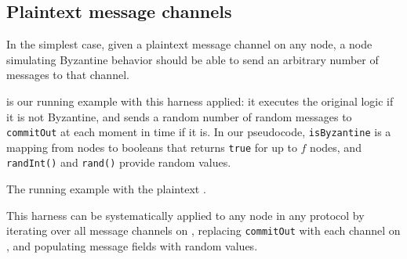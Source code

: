 
\subsection{Plaintext message channels}
\label{sec:plaintext-channels-formalism}
In the simplest case, given a plaintext message channel on any node, a node simulating Byzantine behavior should be able
to send an arbitrary number of messages to that channel.

 is our running example with this harness applied: it executes the original logic if it is not Byzantine, and sends a random number of random messages to \texttt{commitOut} at each moment in time if it is.
In our pseudocode, \texttt{isByzantine} is a mapping from nodes to booleans that returns \texttt{true} for up to $f$ nodes, and \texttt{randInt()} and \texttt{rand()} provide random values.

\begin{algorithm}
\caption{The running example with the plaintext \randomHarness{}.}
\label{alg:running-example-plaintext-harness}
\end{algorithm}

This harness can be systematically applied to any node in any protocol by iterating over all message channels on , replacing \texttt{commitOut} with each channel on , and populating message fields with random values.

